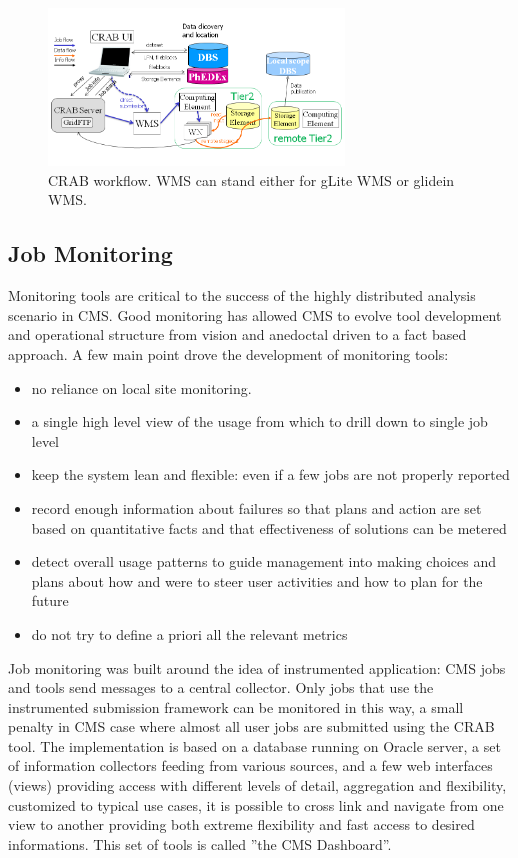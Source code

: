 \begin{figure}
 \includegraphics[width=0.70\textwidth]{figures/CRABWorkflow.png}
\caption{CRAB workflow. WMS can stand either for gLite WMS or glidein WMS.}
\label{fig:CRABWorkflow}
\end{figure}

\subsection{Job Monitoring}
\label{sec:3_3}
Monitoring tools are critical to the success of the
highly distributed analysis scenario in CMS.
Good monitoring has allowed CMS to evolve tool development
and operational structure from vision and anedoctal driven
to a fact based approach.
A few main point drove the development of monitoring tools:
\begin{itemize}
\item no reliance on local site monitoring.
\item a single  high level view of the usage from which
  to drill down to single job level
\item   keep the system lean and flexible: even if a few
  jobs are not properly reported
\item record
  enough information about failures so that plans and
action are set
  based on quantitative facts and that effectiveness of solutions can be metered
\item detect overall usage patterns to guide management into making
 choices and plans about how and were to steer user activities and
 how to plan for the future
\item do not try to define a priori all the relevant metrics
\end{itemize}

Job monitoring was built around the idea of instrumented
application: CMS jobs and tools send messages
to a central collector. Only jobs that use the
instrumented submission framework can be monitored in this way,
a small penalty in CMS case where almost
all user jobs are submitted using the CRAB tool.
The implementation is based on a
database running on Oracle server, a set of information collectors
feeding from various sources, 
and a few web interfaces (views) providing access with different levels
of detail, aggregation and flexibility, customized to
typical use cases, it is possible to cross link and navigate
from one view to another providing both extreme flexibility
and fast access to desired informations.
This set of tools is called ''the CMS Dashboard''.

